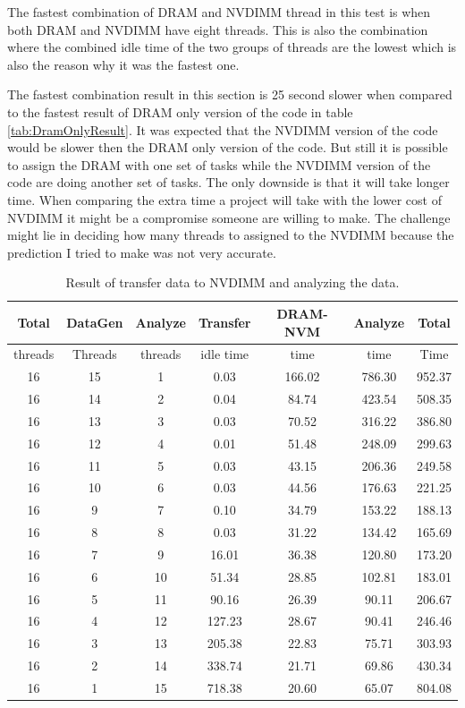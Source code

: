 \documentclass[12pt,a4paper,USenglish]{article}      %
\begin{document}
The fastest combination of DRAM and NVDIMM thread in this test is when both DRAM and NVDIMM have eight threads. This is also the combination where the combined idle time of the two groups of threads are the lowest which is also the reason why it was the fastest one. 

The fastest combination result in this section is 25 second slower when compared to the fastest result of DRAM only version of the code in table \ref{tab:DramOnlyResult}. It was expected that the NVDIMM version of the code would be slower then the DRAM only version of the code. But still it is possible to assign the DRAM with one set of tasks while the NVDIMM version of the code are doing another set of tasks. The only downside is that it will take longer time. When comparing the extra time a project will take with the lower cost of NVDIMM it might be a compromise someone are willing to make. The challenge might lie in deciding how many threads to assigned to the NVDIMM because the prediction I tried to make was not very accurate.

\begin{table}[!hbtp]
\begin{tabular}{ |c|c|c|c|c|c|c| } 
\hline
Total & DataGen & Analyze & Transfer & DRAM-NVM & Analyze & Total \\
\hline
threads & Threads & threads & idle time & time & time & Time \\
\hline
16 & 15 & 1 & 0.03 & 166.02 & 786.30 & 952.37 \\
\hline
16 & 14 & 2 & 0.04 & 84.74 & 423.54 & 508.35 \\
\hline
16 & 13 & 3 & 0.03 & 70.52 & 316.22 & 386.80 \\
\hline
16 & 12 & 4 & 0.01 & 51.48 & 248.09 & 299.63 \\
\hline
16 & 11 & 5 & 0.03 & 43.15 & 206.36 & 249.58 \\
\hline
16 & 10 & 6 & 0.03 & 44.56 & 176.63 & 221.25 \\
\hline
16 & 9 & 7 & 0.10 & 34.79 & 153.22 & 188.13 \\
\hline
16 & 8 & 8 & 0.03 & 31.22 & 134.42 & 165.69 \\
\hline
16 & 7 & 9 & 16.01 & 36.38 & 120.80 & 173.20 \\
\hline
16 & 6 & 10 & 51.34 & 28.85 & 102.81 & 183.01 \\
\hline
16 & 5 & 11 & 90.16 & 26.39 & 90.11 & 206.67 \\
\hline
16 & 4 & 12 & 127.23 & 28.67 & 90.41 & 246.46 \\
\hline
16 & 3 & 13 & 205.38 & 22.83 & 75.71 & 303.93 \\
\hline
16 & 2 & 14 & 338.74 & 21.71 & 69.86 & 430.34 \\
\hline
16 & 1 & 15 & 718.38 & 20.60 & 65.07 & 804.08 \\
\hline
\end{tabular}
\caption{Result of transfer data to NVDIMM and analyzing the data.}
\label{tab:nvmanalyzetimes}
\end{table}
\end{document}
